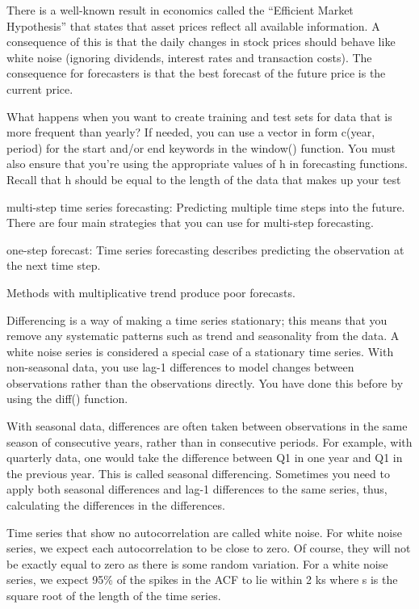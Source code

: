 \documentclass[]{book}
\begin{document}
There is a well-known result in economics called the ``Efficient Market Hypothesis'' that states that asset prices reflect all available information. A consequence of this is that the daily changes in stock prices should behave like white noise (ignoring dividends, interest rates and transaction costs). The consequence for forecasters is that the best forecast of the future price is the current price.

What happens when you want to create training and test sets for data that is more frequent than yearly? If needed, you can use a vector in form c(year, period) for the start and/or end keywords in the window() function. You must also ensure that you're using the appropriate values of h in forecasting functions. Recall that h should be equal to the length of the data that makes up your test

multi-step time series forecasting: Predicting multiple time steps into the future. There are four main strategies that you can use for multi-step forecasting.

one-step forecast: Time series forecasting describes predicting the observation at the next time step.

Methods with multiplicative trend produce poor forecasts.

Differencing is a way of making a time series stationary; this means that you remove any systematic patterns such as trend and seasonality from the data. A white noise series is considered a special case of a stationary time series. With non-seasonal data, you use lag-1 differences to model changes between observations rather than the observations directly. You have done this before by using the diff() function.

With seasonal data, differences are often taken between observations in the same season of consecutive years, rather than in consecutive periods. For example, with quarterly data, one would take the difference between Q1 in one year and Q1 in the previous year. This is called seasonal differencing. Sometimes you need to apply both seasonal differences and lag-1 differences to the same series, thus, calculating the differences in the differences.

Time series that show no autocorrelation are called white noise. For white noise series, we expect each autocorrelation to be close to zero. Of course, they will not be exactly equal to zero as there is some random variation. For a white noise series, we expect 95\% of the spikes in the ACF to lie within 2 ks where s is the square root of the length of the time series.
\end{document}
